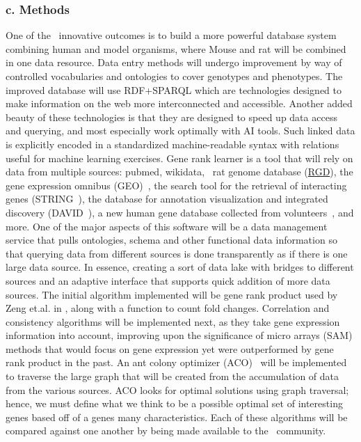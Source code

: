 \subsubsection*{c. Methods}
One of the \GN\ innovative outcomes is to build a more powerful database system combining human and model organisms, where Mouse and rat will be combined in one data resource.
Data entry methods will undergo improvement by way of controlled vocabularies and ontologies to cover genotypes and phenotypes.
The improved database will use RDF+SPARQL which are technologies designed to make information on the web more interconnected and accessible.
Another added beauty of these technologies is that they are designed to speed up data access and querying, and most especially work optimally with AI tools.
Such linked data is explicitly encoded in a standardized machine-readable syntax with relations useful for machine learning exercises\cite{toh2019}.
Gene rank learner is a tool that will rely on data from multiple sources: pubmed, wikidata, \GN\, rat genome database (\href{http://rgd.mcw.edu}{RGD}), the gene expression omnibus (GEO)~\cite{NCBIGeo}, the search tool for the retrieval of interacting genes (STRING~\cite{STRING}), the database for annotation visualization and integrated discovery (DAVID~\cite{DAVID}), a new human gene database collected from volunteers~\cite{henderson2020}, and more.
One of the major aspects of this software will be a data management service that pulls ontologies, schema and other functional data information so that querying data from different sources is done transparently as if there is one large data source. 
In essence, creating a sort of data lake with bridges to different sources and an adaptive interface that supports quick addition of more data sources.
The initial algorithm implemented will be gene rank product used by Zeng et.al. in \cite{zeng2016discovering}, along with a function to count fold changes.
Correlation and consistency algorithms will be implemented next, as they take gene expression information into account, improving upon the significance of micro arrays (SAM) methods that would focus on gene expression yet were outperformed by gene rank product in the past.
An ant colony optimizer (ACO)~\cite{ACO:2009} will be implemented to traverse the large graph that will be created from the accumulation of data from the various sources.
ACO looks for optimal solutions using graph traversal; hence, we must define what we think to be a possible optimal set of interesting genes based off of a genes many characteristics.
Each of these algorithms will be compared against one another by being made available to the \GN\ community.
